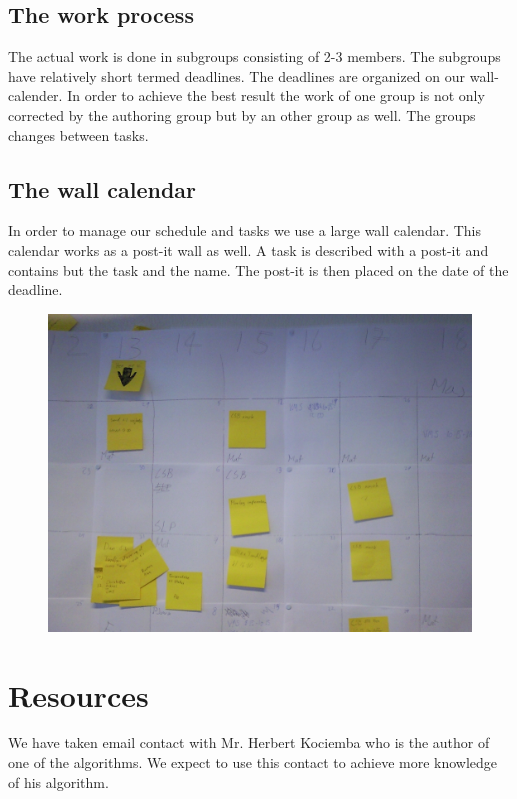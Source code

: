 \documentclass{article}
\begin{document}
\subsection{The work process}
The actual work is done in subgroups consisting of 2-3 members.  The subgroups have relatively short termed deadlines. The deadlines are organized on our wall-calender. In order to achieve the best result the work of one group is not only corrected by the authoring group but by an other group as well. The groups changes between tasks. 

\subsection{The wall calendar}
In order to manage our schedule and tasks we use a large wall calendar. This calendar works as a post-it wall as well. A task is described with a post-it and contains but the task and the name. The post-it is then placed on the date of the deadline.
\begin{figure}[hp]
	\centering
		\includegraphics[scale = 0.1]{Billede0075.jpg}
		
		\label{fig:wall}
\end{figure}


\section{Resources}
We have taken email contact with Mr. Herbert Kociemba who is the author of one of the algorithms. We expect to use this contact to achieve more knowledge of his algorithm.
\end{document}
